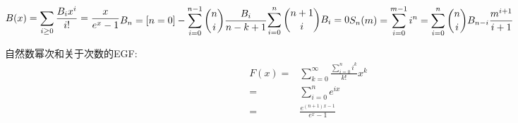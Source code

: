 \begin{math}
    \begin{aligned}B(x)=\sum_{i\ge 0}\frac{B_i x^i}{i!}=\frac x{e^x-1}\end{aligned} \\
    \begin{aligned}B_n=[n=0]-\sum_{i=0}^{n-1}{n\choose i}\frac{B_i}{n-k+1}\end{aligned} \\
    \begin{aligned}\sum_{i=0}^n{n+1\choose i}B_i=0\end{aligned} \\
    \begin{aligned}S_n(m)=\sum_{i=0}^{m-1}i^n=\sum_{i=0}^n{n\choose i}B_{n-i}\frac{m^{i+1}}{i+1}\end{aligned}
\end{math}

自然数幂次和关于次数的EGF:
$$ \begin{aligned} F(x)=&\sum_{k=0}^\infty \frac{\sum_{i=0}^n i^k}{k!}x^k\\ =&\sum_{i=0}^n e^{ix}\\ =&\frac{e^{(n+1)x-1}}{e^x-1} \end{aligned} $$